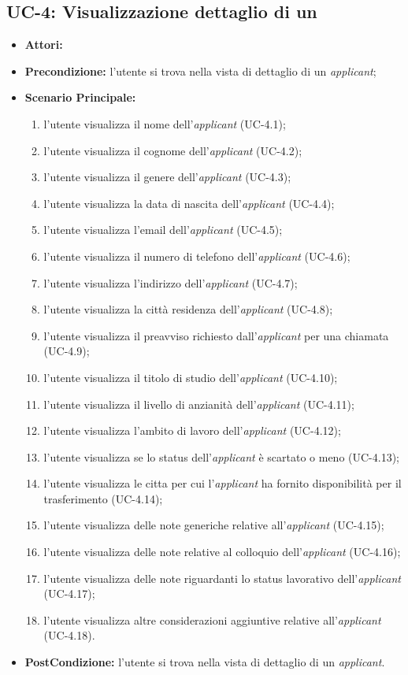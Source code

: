 \subsection{UC-4: Visualizzazione dettaglio di un \applicant }
\begin{itemize}
	\item \textbf{Attori:} \loggedusr
	\item \textbf{Precondizione:}  l'utente si trova nella vista di dettaglio di un \textit{applicant};
	\item \textbf{Scenario Principale:}
	\begin{enumerate}
		\item l'utente visualizza il nome dell'\textit{applicant} (UC-4.1); 
		\item l'utente visualizza il cognome dell'\textit{applicant} (UC-4.2);
		\item l'utente visualizza il genere dell'\textit{applicant} (UC-4.3);
		\item l'utente visualizza la data di nascita dell'\textit{applicant} (UC-4.4);
		\item l'utente visualizza l'email dell'\textit{applicant} (UC-4.5);
		\item l'utente visualizza il numero di telefono dell'\textit{applicant} (UC-4.6);	
		\item l'utente visualizza l'indirizzo dell'\textit{applicant} (UC-4.7);
		\item l'utente visualizza la città residenza dell'\textit{applicant} (UC-4.8);
		\item l'utente visualizza il preavviso richiesto dall'\textit{applicant} per una chiamata (UC-4.9);
		\item l'utente visualizza il titolo di studio dell'\textit{applicant} (UC-4.10);
		\item l'utente visualizza il livello di anzianità dell'\textit{applicant} (UC-4.11);
		\item l'utente visualizza l'ambito di lavoro dell'\textit{applicant} (UC-4.12);
		\item l'utente visualizza se lo status dell'\textit{applicant} è scartato o meno (UC-4.13);
		\item l'utente visualizza le citta per cui l'\textit{applicant} ha fornito disponibilità per il trasferimento (UC-4.14);
		\item l'utente visualizza delle note generiche relative all'\textit{applicant} (UC-4.15);
		\item l'utente visualizza delle note relative al colloquio dell'\textit{applicant} (UC-4.16);
		\item l'utente visualizza delle note riguardanti lo status lavorativo dell'\textit{applicant} (UC-4.17);
		\item l'utente visualizza altre considerazioni aggiuntive relative all'\textit{applicant} (UC-4.18).
	\end{enumerate}
	\item \textbf{PostCondizione:}  l'utente si trova nella vista di dettaglio di un \textit{applicant}.
\end{itemize}

